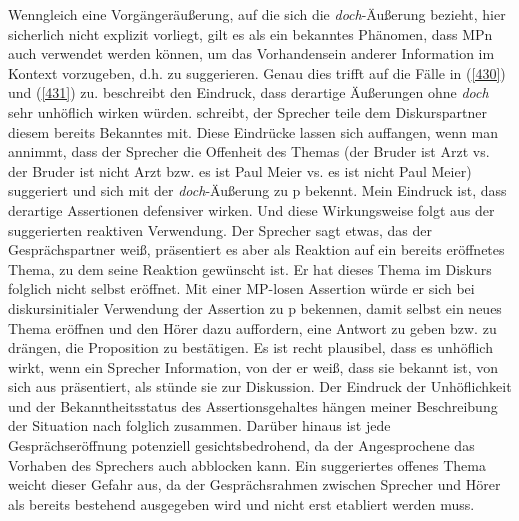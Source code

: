 Wenngleich eine Vorgängeräußerung, auf die sich die \textit{doch}-Äußerung bezieht, hier sicherlich nicht explizit vorliegt, gilt es als ein bekanntes Phänomen, dass MPn auch verwendet werden können, um das Vorhandensein anderer Information im Kontext vorzugeben, d.h. zu suggerieren. Genau dies trifft auf die Fälle in (\ref{430}) und (\ref{431}) zu. \citet[Fn 14]{Repp2013} beschreibt den Eindruck, dass derartige Äußerungen ohne \textit{doch} sehr unhöflich wirken würden. \citet[138]{Egg2013} schreibt, der Sprecher teile dem Diskurspartner diesem bereits Bekanntes mit. Diese Eindrücke lassen sich auffangen, wenn man annimmt, dass der Sprecher die Offenheit des Themas (der Bruder ist Arzt vs. der Bruder ist nicht Arzt bzw. es ist Paul Meier vs. es ist nicht Paul Meier) suggeriert und sich mit der \textit{doch}-Äußerung zu p bekennt. Mein Eindruck ist, dass derartige Assertionen defensiver wirken. Und diese Wirkungsweise folgt aus der suggerierten reaktiven Verwendung. Der Sprecher sagt etwas, das der Gesprächspartner weiß, präsentiert es aber als Reaktion auf ein bereits eröffnetes Thema, zu dem seine Reaktion gewünscht ist. Er hat dieses Thema im Diskurs folglich nicht selbst eröffnet. Mit einer MP-losen Assertion würde er sich bei diskursinitialer Verwendung der Assertion zu p bekennen, damit selbst ein neues Thema eröffnen und den Hörer dazu auffordern, eine Antwort zu geben bzw. zu drängen, die Proposition zu bestätigen. Es ist recht plausibel, dass es unhöflich wirkt, wenn ein Sprecher Information, von der er weiß, dass sie bekannt ist, von sich aus präsentiert, als stünde sie zur Diskussion. Der Eindruck der Unhöflichkeit und der Bekanntheitsstatus des Asser\-tionsgehaltes hängen meiner Beschreibung der Situation nach folglich zusammen. Darüber hinaus ist jede Gesprächseröffnung potenziell gesichtsbedrohend, da der Angesprochene das Vorhaben des Sprechers auch abblocken kann. Ein suggeriertes offenes Thema weicht dieser Gefahr aus, da der Gesprächsrahmen zwi\-schen Sprecher und Hörer als bereits bestehend ausgegeben wird und nicht erst etabliert werden muss.

